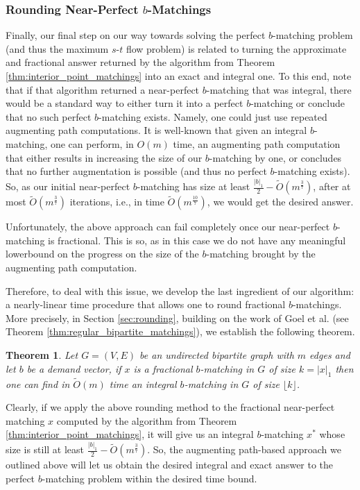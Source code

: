 \documentclass[11pt, letterpaper]{article}
\newtheorem{theorem}{Theorem}[section]
\newcommand{\floor}[1]{\lfloor #1 \rfloor}
\newcommand{\onorm}[1]{|#1|_{1}}
\newcommand{\tO}[1]{\widetilde{O}(#1)}
\newcommand{\bb}{\boldsymbol{\mathit{b}}}
\newcommand{\xx}{\boldsymbol{\mathit{x}}}
\begin{document}
\subsubsection*{Rounding Near-Perfect $\bb$-Matchings}

Finally, our final step on our way towards solving the perfect $\bb$-matching problem (and thus the maximum $s$-$t$ flow problem) is related to turning the approximate and fractional answer returned by the algorithm from Theorem \ref{thm:interior_point_matchings} into an exact and integral one. To this end, note that if that algorithm returned a near-perfect $\bb$-matching that was integral, there would be a standard way to either turn it into a perfect $\bb$-matching or conclude that no such perfect $\bb$-matching exists. Namely, one could just use repeated augmenting path computations. It is well-known that given an integral $\bb$-matching, one can perform,  in $O(m)$ time, an augmenting path computation that either results in increasing the size of our $\bb$-matching by one, or concludes that no further augmentation is possible (and thus no perfect $\bb$-matching exists). So, as our initial near-perfect $\bb$-matching has size at least $\frac{\onorm{\bb}}{2}-\tO{m^{\frac{3}{7}}}$, after at most $\tO{m^{\frac{3}{7}}}$ iterations, i.e., in time $\tO{m^{\frac{10}{7}}}$, we would get the desired answer. 

Unfortunately, the above approach can fail completely once our near-perfect $\bb$-matching is fractional. This is so, as in this case we do not have any meaningful lowerbound on the progress on the size of the $\bb$-matching brought by the augmenting path computation. 

Therefore, to deal with this issue, we develop the last ingredient of our algorithm: a nearly-linear time procedure that allows one to round fractional $\bb$-matchings.  More precisely, in Section \ref{sec:rounding}, building on the work of Goel et al. \cite{GoelKK10} (see Theorem \ref{thm:regular_bipartite_matchings}), we establish the following theorem.

\begin{theorem}\label{thm:rounding_matchings}
Let $G=(V,E)$ be an undirected bipartite graph with $m$ edges and let $\bb$ be a demand vector, if $\xx$ is a fractional $\bb$-matching in $G$ of size $k=\onorm{\xx}$ then one can find in $\tO{m}$ time an integral $\bb$-matching in $G$ of size $\floor{k}$.
\end{theorem}

Clearly, if we apply the above rounding method to the fractional near-perfect matching $\xx$ computed by the algorithm from Theorem \ref{thm:interior_point_matchings}, it will give us an integral $\bb$-matching $\xx^*$ whose size is still at least $\frac{\onorm{\bb}}{2}-\tO{m^{\frac{3}{7}}}$. So, the augmenting path-based approach we outlined above will let us obtain the desired integral and exact answer to the perfect $\bb$-matching problem within the desired time bound. 
\end{document}
